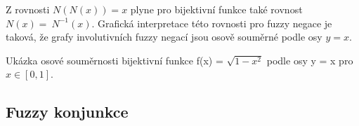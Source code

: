     \begin{remark}
        Z rovnosti $N(N(x))=x$ plyne pro bijektivn\'i funkce tak\'e rovnost $N(x)=~N^{-1}(x).$ 
         Grafick\'a interpretace  t\'eto rovnosti  pro fuzzy negace je taková, že grafy involutivních fuzzy negací jsou osově souměrné podle osy $y = x$.
        \begin{graph} Ukázka osové souměrnosti bijektivní funkce f(x) = $\sqrt{1-x^2}$ podle osy y = x pro $x \in [0,1]$.\\
            
        \end{graph}
    \end{remark}

    
\subsection{Fuzzy konjunkce}

